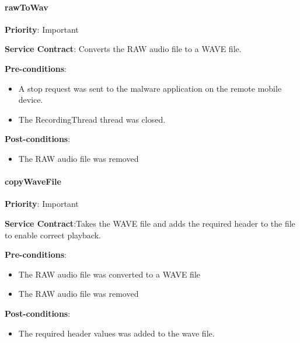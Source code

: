 	
        \paragraph{rawToWav}
			\begin{description}
			    \item{\textbf{Priority}:} Important%
			    \item{\textbf{Service Contract}:} Converts the RAW audio file to a WAVE file. 	%
			    \item{\textbf{Pre-conditions}:}%
    			    \begin{itemize}
    			        \item A stop request was sent to the malware application on the remote mobile device.
    			        \item The RecordingThread thread was closed.
    			    \end{itemize}
			    \item{\textbf{Post-conditions}:} %
    			    \begin{itemize}
    			    \item The RAW audio file was removed
    			    \end{itemize}
			\end{description} 
	
	
        \paragraph{copyWaveFile}
			\begin{description}
			    \item{\textbf{Priority}:} Important%
			    \item{\textbf{Service Contract}:}Takes the WAVE file and adds the required header to the file to enable correct playback.%
			    \item{\textbf{Pre-conditions}:}%
    			    \begin{itemize}
    			        \item The RAW audio file was converted to a WAVE file
    			        \item The RAW audio file was removed
    			    \end{itemize}
			    \item{\textbf{Post-conditions}:} %
    			    \begin{itemize}
    			    \item The required header values was added to the wave file. 
    			    \end{itemize}
			\end{description}
	
